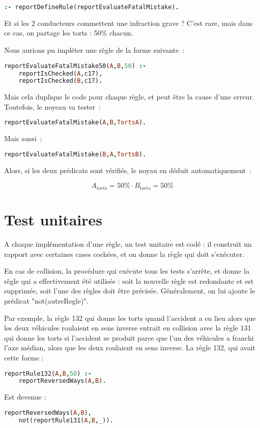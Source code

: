 \begin{lstlisting}[language=Prolog,frame=single]
:- reportDefineRule(reportEvaluateFatalMistake).
\end{lstlisting}

Et si les 2 conducteurs commettent une infraction grave ?
C'est rare, mais dans ce cas, on partage les torts : 50\% chacun.

Nous aurions pu impléter une règle de la forme suivante~:

\begin{lstlisting}[language=Prolog,frame=single]
reportEvaluateFatalMistake50(A,B,50) :-
    reportIsChecked(A,c17),
    reportIsChecked(B,c17).
\end{lstlisting}

Mais cela duplique le code pour chaque règle, et peut être la cause d'une erreur. Toutefois, le noyeau va tester~:

\begin{lstlisting}[language=Prolog,frame=single]
reportEvaluateFatalMistake(A,B,TortsA).
\end{lstlisting}

Mais aussi~:

\begin{lstlisting}[language=Prolog,frame=single]
reportEvaluateFatalMistake(B,A,TortsB).
\end{lstlisting}

Alors, si les deux prédicats sont vérifiés, le noyau en déduit automatiquement~:

\[A_{torts} = 50\% \cdot B_{torts} = 50\%\]

\section{Test unitaires}

A chaque implémentation d'une règle, un test unitaire est codé : il construit un rapport avec certaines cases cochées, et on donne la règle qui doit s'exécuter.

En cas de collision, la procédure qui exécute tous les tests s'arrête, et donne la règle qui a effectivement été utilisée : soit la nouvelle règle est redondante et est supprimée, soit l'une des règles doit être précisée. Généralement, on lui ajoute le prédicat "not(autreRegle)".

Par exemple, la règle 132 qui donne les torts quand l'accident a eu lieu alors que les deux véhicules roulaient en sens inverse entrait en collision avec la règle 131 qui donne les torts si l'accident se produit parce que l'un des véhicules a franchi l'axe médian, alors que les deux roulaient en sens inverse.
La règle 132, qui avait cette forme :

\begin{lstlisting}[language=Prolog,frame=single]
reportRule132(A,B,50) :-
    reportReversedWays(A,B).
\end{lstlisting}

Est devenue :

\begin{lstlisting}[language=Prolog,frame=single]
reportReversedWays(A,B),
    not(reportRule131(A,B,_)).
\end{lstlisting}

